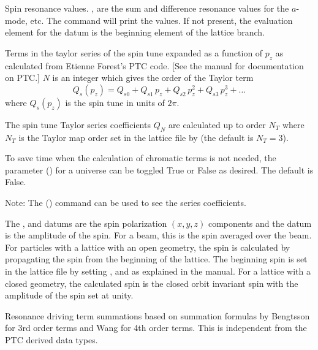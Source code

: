 \begin{description}
{{{{  %
  \item[spin_res.a.sum, .a.diff, .b.sum, .b.diff, .c.sum, .c.diff] \Newline {}
Spin resonance values. ,  are the sum and difference resonance values for the
$a$-mode, etc. The  command will print the values. If not present, the
evaluation element for the datum is the beginning element of the lattice branch.

  \item[spin_tune_ptc.$N$, $N = 0, 1, 2, \ldots$] \Newline {}
Terms in the taylor series of the spin tune expanded as a function of $p_z$ as calculated from
Etienne Forest's PTC code. [See the \bmad manual for documentation on PTC.] $N$ is an integer which
gives the order of the Taylor term
\begin{equation}
  Q_s(p_z) = Q_{s0} + Q_{s1} \, p_z + Q_{s2} \, p_z^2 + Q_{s3} \, p_z^3 + \ldots
\end{equation}
where $Q_s(p_z)$ is the spin tune in units of $2\pi$.

The spin tune Taylor series coefficients $Q_N$ are calculated up to order $N_T$ where $N_T$ is the
Taylor map order set in the lattice file by  (the default is $N_T=3$). 

To save time when the calculation of chromatic terms is not needed, the  parameter
() for a universe can be toggled True or False as desired. The default is False.

Note: The  () command can be used to see the series coefficients.

  \item[spin.x, .y, .z, .amp] \Newline {}
The ,  and  datums are the spin polarization $(x, y, z)$ components
and the  datum is the amplitude of the spin. For a beam, this is the spin averaged over
the beam.  For particles with a lattice with an open geometry, the spin is calculated by propagating
the spin from the beginning of the lattice. The beginning spin is set in the lattice file by setting
,  and  as explained in the \bmad
manual. For a lattice with a closed geometry, the calculated spin is the closed orbit invariant spin
with the amplitude of the spin set at unity.

  \item[srdt.h<monomial>.\{r,i,a\}] \Newline {}
Resonance driving term summations based on summation formulas by Bengtsson\cite{b:bengtsson} for 3rd
order terms and Wang\cite{b:wang} for 4th order terms. This is independent from the PTC derived
 data types. 

}}}}
\end{description}
